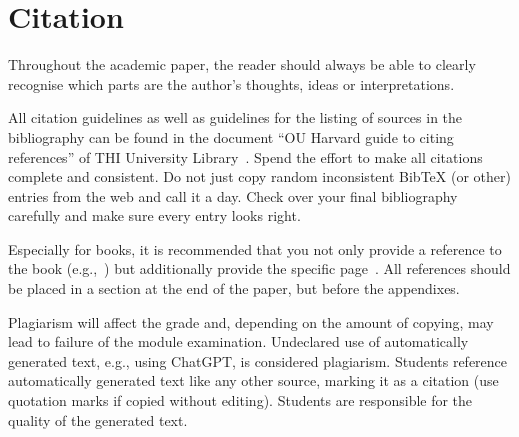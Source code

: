 \section{Citation}

Throughout the academic paper, the reader should always be able to clearly recognise which parts are
the author's thoughts, ideas or interpretations. 

All citation guidelines as well as guidelines for the listing of sources in the bibliography can be
found in the document \enquote{OU Harvard guide to citing references} of THI University
Library~\cite{THI23}. Spend the effort to make all citations complete and consistent. Do not just
copy random inconsistent BibTeX (or other) entries from the web and call it a day. Check over your
final bibliography carefully and make sure every entry looks right.~\cite{JW06} 

Especially for books, it is recommended that you not only provide a reference to the book
(e.g.,~\cite{BertGal92}) but additionally provide the specific page~\cite[p. 123]{Cov12}. All
references should be placed in a section at the end of the paper, but before the appendixes.

Plagiarism will affect the grade and, depending on the amount of copying, may lead to failure of the
module examination. Undeclared use of automatically generated text, e.g., using ChatGPT, is
considered plagiarism. Students reference automatically generated text like any other source,
marking it as a citation (use quotation marks if copied without editing). Students are responsible
for the quality of the generated text.
